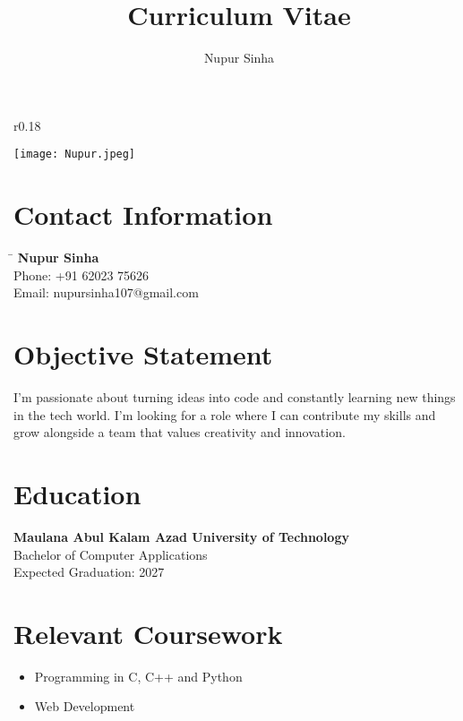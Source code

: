 \documentclass[a4paper,10pt]{article}
\begin{document}
\title{Curriculum Vitae}
\author{Nupur Sinha}
\date{}
\begin{wrapfigure}[14]{r}{0.18\textwidth}
    \vspace{-50pt}
    \begin{center}
    \texttt{[image: Nupur.jpeg]}
    \end{center}
    \vspace{-10pt}
\end{wrapfigure}
\maketitle
\section*{Contact Information}
\begin{tabbing}
\hspace{3in} \= \kill
\textbf{Nupur Sinha} \\                                               
Phone: +91 62023 75626  \\                                                      
Email: nupursinha107@gmail.com \\
\end{tabbing}

\section*{Objective Statement}
I’m passionate about turning ideas into code and constantly learning new things in the tech world. I’m looking for a role where I can contribute my skills and grow alongside a team that values creativity and innovation.

\section*{Education}
\textbf{Maulana Abul Kalam Azad University of Technology} \\
Bachelor of Computer Applications \\
Expected Graduation: 2027

\section*{Relevant Coursework}
\begin{itemize}[left=0pt]
    \item Programming in C, C++ and Python
    \item Web Development
\end{itemize}
\end{document}
